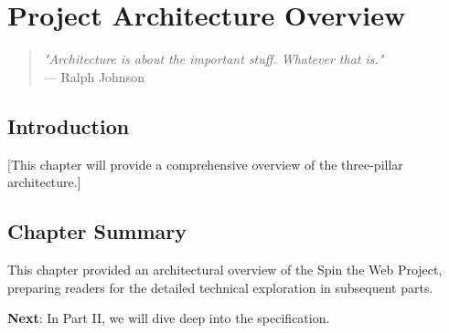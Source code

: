 
\chapter{Project Architecture Overview}
\label{chap:architecture}

\begin{quote}
\textit{"Architecture is about the important stuff. Whatever that is."} \\
— Ralph Johnson
\end{quote}

\section{Introduction}

[This chapter will provide a comprehensive overview of the three-pillar architecture.]

\section{Chapter Summary}

This chapter provided an architectural overview of the Spin the Web Project, preparing readers for the detailed technical exploration in subsequent parts.

\textbf{Next}: In Part II, we will dive deep into the \wbdl{} specification.
